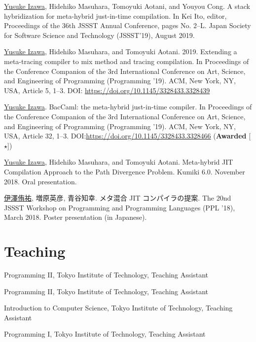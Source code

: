 \documentclass[11pt]{article} %
\newcommand{\YusukeIzawa}{\underline{Yusuke Izawa}}
\newcommand{\伊澤侑祐}{\underline{伊澤侑祐}}
\newcommand{\jit}{\textsc{JIT} }
\begin{document}
 \YusukeIzawa, Hidehiko Masuhara, Tomoyuki Aotani, and Youyou
Cong. A stack hybridization for meta-hybrid just-in-time compilation. In Kei
Ito, editor, Proceedings of the 36th JSSST Annual Conference, pages
No. 2–L. Japan Society for Software Science and Technology (JSSST'19), August
2019.
\medskip

 \YusukeIzawa, Hidehiko Masuhara, and Tomoyuki
Aotani. 2019. Extending a meta-tracing compiler to mix method and tracing
compilation. In Proceedings of the Conference Companion of the 3rd International
Conference on Art, Science, and Engineering of Programming (Programming
’19). ACM, New York, NY, USA, Article 5, 1–3. DOI:
\url{https://doi.org/10.1145/3328433.3328439}
\medskip

 \YusukeIzawa. BacCaml: the meta-hybrid just-in-time compiler. In
Proceedings of the Conference Companion of the 3rd International Conference on
Art, Science, and Engineering of Programming (Programming ’19). ACM, New York,
NY, USA, Article 32, 1–3. DOI:\url{https://doi.org/10.1145/3328433.3328466}
(\textbf{Awarded} [$\star$])

\medskip

 \YusukeIzawa, Hidehiko Masuhara, and Tomoyuki Aotani.  Meta-hybrid
\jit Compilation Approach to the Path Divergence Problem. Kumiki 6.0. November
2018. Oral presentation.
\medskip

 \伊澤侑祐, 増原英彦, 青谷知幸. メタ混合 \jit コンパイラの提案. The
20nd JSSST Workshop on Programming and Programming Languages (PPL '18), March
2018. Poster presentation (in Japanese).
\medskip


\section*{Teaching}

 Programming II, Tokyo Institute of Technology, Teaching Assistant

 Programming II, Tokyo Institute of Technology, Teaching Assistant

 Introduction to Computer Science, Tokyo Institute of Technology, Teaching Assistant

 Programming I, Tokyo Institute of Technology, Teaching Assistant
\end{document}
